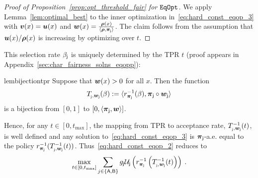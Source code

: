 		\begin{proof}[Proof of Proposition~\ref{prop:opt_threshold_fair} for $\mathtt{EqOpt}$] 
			We apply Lemma~\ref{lem:optimal_best} to the inner optimization in~\eqref{eq:hard_const_eqop_3} with $\boldsymbol{v}(x) = \boldsymbol{u}(x)$ and $\boldsymbol{w}(x) = \frac{\boldsymbol{\rho}(x)}{\langle \boldsymbol{\rho}, \boldsymbol{\pi}_{\mathsf{j}}\rangle}$. The claim follows from the assumption that $\boldsymbol{u}(x)/\boldsymbol{\rho}(x)$ is increasing by optimizing over $t$.
		\end{proof}


		This selection rate $\beta_{\mathsf{j}}$ is uniquely determined by the TPR $t$ (proof appears in Appendix~\ref{sec:char_fairness_solns_eqopp}):
		
		\begin{restatable}{lem}{bijectiontpr}
		\label{lem:bijection_tpr_accrate}
Suppose that $\boldsymbol{w}(x) > 0$ for all $x$. Then the function
		\begin{eqnarray*}
		T_{_{\mathsf{j}},\boldsymbol{w}_{\mathsf{j}}}(\beta):=	\langle r_{\boldsymbol{\pi}_{\mathsf{j}}}^{-1}(\beta),\boldsymbol{\pi}_{\mathsf{j}} \circ \boldsymbol{w}_{\mathsf{j}} \rangle
		\end{eqnarray*}
		is a bijection from $[0,1]$ to $[0,\langle \boldsymbol{\pi}_{\mathsf{j}}, \boldsymbol{w} \rangle]$. 
		\end{restatable}
		Hence, for any $t \in [0,t_{\max}]$, the mapping from TPR to acceptance rate, $T_{_{\mathsf{j}},\boldsymbol{w}_{\mathsf{j}}}^{-1}(t)$, is well defined and any solution to~\eqref{eq:hard_const_eqop_3} is $\boldsymbol{\pi}_{\mathsf{j}}$-a.e. equal to the policy $r_{\boldsymbol{\pi}_{\mathsf{j}}}^{-1}(T_{_{\mathsf{j}},\boldsymbol{w}_{\mathsf{j}}}^{-1}(t))$. Thus~\eqref{eq:hard_const_eqop_2} reduces to 
		\begin{eqnarray}\label{eq:hard_const_eqop_accrate}
		\max_{t \in [0,t_{\max}]} \sum_{j \in \{\mathsf{A}, \mathsf{B}\}}g_{\mathsf{j}} \mathcal{U}_{\mathsf{j}}\left(r_{\boldsymbol{\pi}_{\mathsf{j}}}^{-1}\left(T_{_{\mathsf{j}},\boldsymbol{w}_{\mathsf{j}}}^{-1}(t)\right)\right)\:.
		\end{eqnarray}

				


